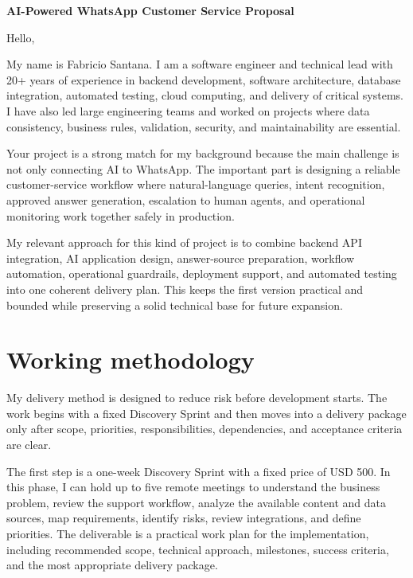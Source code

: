 \documentclass[11pt,a4paper]{article}
\begin{document}
\begin{center}
{\LARGE\bfseries AI-Powered WhatsApp Customer Service Proposal}
\end{center}
\vspace{0.5em}

Hello,\par

My name is Fabricio Santana. I am a software engineer and technical lead with 20+ years of experience in backend development, software architecture, database integration, automated testing, cloud computing, and delivery of critical systems. I have also led large engineering teams and worked on projects where data consistency, business rules, validation, security, and maintainability are essential.\par

Your project is a strong match for my background because the main challenge is not only connecting AI to WhatsApp. The important part is designing a reliable customer-service workflow where natural-language queries, intent recognition, approved answer generation, escalation to human agents, and operational monitoring work together safely in production.\par

My relevant approach for this kind of project is to combine backend API integration, AI application design, answer-source preparation, workflow automation, operational guardrails, deployment support, and automated testing into one coherent delivery plan. This keeps the first version practical and bounded while preserving a solid technical base for future expansion.\par

\section*{Working methodology}

My delivery method is designed to reduce risk before development starts. The work begins with a fixed Discovery Sprint and then moves into a delivery package only after scope, priorities, responsibilities, dependencies, and acceptance criteria are clear.\par

The first step is a one-week Discovery Sprint with a fixed price of USD 500. In this phase, I can hold up to five remote meetings to understand the business problem, review the support workflow, analyze the available content and data sources, map requirements, identify risks, review integrations, and define priorities. The deliverable is a practical work plan for the implementation, including recommended scope, technical approach, milestones, success criteria, and the most appropriate delivery package.\par
\end{document}
